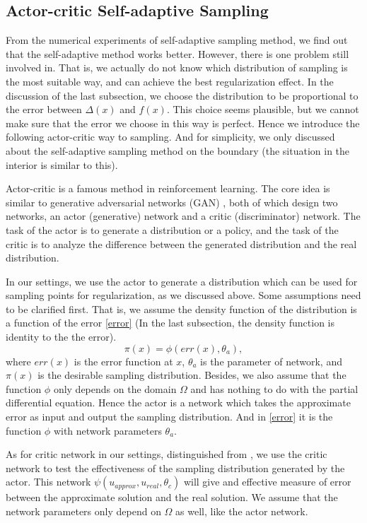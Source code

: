 \documentclass{article}
\begin{document}
\subsection{Actor-critic Self-adaptive Sampling}
\par From the numerical experiments of self-adaptive sampling method, we find out that the self-adaptive method works better. However, there is one problem still involved in. That is, we actually do not know which distribution of sampling is the most suitable way, and can achieve the best regularization effect. In the discussion of the last subsection, we choose the distribution to be proportional to the error between $\Delta(x)$ and $f(x)$. This choice seems plausible, but we cannot make sure that the error we choose in this way is perfect. Hence we introduce the following actor-critic way to sampling. And for simplicity, we only discussed about the self-adaptive sampling method on the boundary (the situation in the interior is similar to this).
\par Actor-critic \cite{konda2000actor} is a famous method in reinforcement learning. The core idea is similar to generative adversarial networks (GAN) \cite{goodfellow2014generative}, both of which design two networks, an actor (generative) network and a critic (discriminator) network. The task of the actor is to generate a distribution or a policy, and the task of the critic is to analyze the difference between the generated distribution and the real distribution.
\par In our settings, we use the actor to generate a distribution which can be used for sampling points for regularization, as we discussed above. Some assumptions need to be clarified first. That is, we assume the density function of the distribution is a function of the error \eqref{error} (In the last subsection, the density function is identity to the the error). 
\begin{equation}\label{error}
	\pi(x) = \phi(err(x), \theta_{a}),
\end{equation}
where $err(x)$ is the error function at $x$, $\theta_{a}$ is the parameter of network, and $\pi(x)$ is the desirable sampling distribution. Besides, we also assume that the function $\phi$ only depends on the domain $\Omega$ and has nothing to do with the partial differential equation. Hence the actor is a network which takes the approximate error as input and output the sampling distribution. And in \eqref{error} it is the function $\phi$ with network parameters $\theta_{a}$. 
\par As for critic network in our settings, distinguished from \cite{goodfellow2014generative} \cite{konda2000actor}, we use the critic network to test the effectiveness of the sampling distribution generated by the actor. This network $\psi(u_{approx}, u_{real}, \theta_{c})$ will give and effective measure of error between the approximate solution and the real solution. We assume that the network parameters only depend on $\Omega$ as well, like the actor network.
\end{document}
